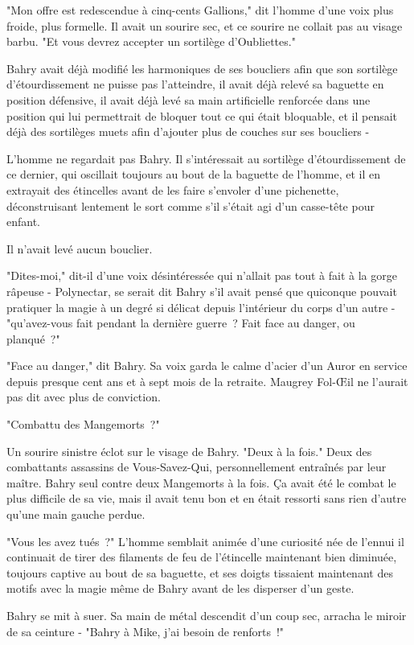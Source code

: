 "Mon offre est redescendue à cinq-cents Gallions," dit l'homme d'une voix plus froide, plus formelle. Il avait un sourire sec, et ce sourire ne collait pas au visage barbu. "Et vous devrez accepter un sortilège d'Oubliettes."

Bahry avait déjà modifié les harmoniques de ses boucliers afin que son sortilège d'étourdissement ne puisse pas l'atteindre, il avait déjà relevé sa baguette en position défensive, il avait déjà levé sa main artificielle renforcée dans une position qui lui permettrait de bloquer tout ce qui était bloquable, et il pensait déjà des sortilèges muets afin d'ajouter plus de couches sur ses boucliers -

L'homme ne regardait pas Bahry. Il s'intéressait au sortilège d'étourdissement de ce dernier, qui oscillait toujours au bout de la baguette de l'homme, et il en extrayait des étincelles avant de les faire s'envoler d'une pichenette, déconstruisant lentement le sort comme s'il s'était agi d'un casse-tête pour enfant.

Il n'avait levé aucun bouclier.

"Dites-moi," dit-il d'une voix désintéressée qui n'allait pas tout à fait à la gorge râpeuse - Polynectar, se serait dit Bahry s'il avait pensé que quiconque pouvait pratiquer la magie à un degré si délicat depuis l'intérieur du corps d'un autre - "qu'avez-vous fait pendant la dernière guerre~? Fait face au danger, ou planqué~?"

"Face au danger," dit Bahry. Sa voix garda le calme d'acier d'un Auror en service depuis presque cent ans et à sept mois de la retraite. Maugrey Fol-Œil ne l'aurait pas dit avec plus de conviction.

"Combattu des Mangemorts~?"

Un sourire sinistre éclot sur le visage de Bahry. "Deux à la fois." Deux des combattants assassins de Vous-Savez-Qui, personnellement entraînés par leur maître. Bahry seul contre deux Mangemorts à la fois. Ça avait été le combat le plus difficile de sa vie, mais il avait tenu bon et en était ressorti sans rien d'autre qu'une main gauche perdue.

"Vous les avez tués~?" L'homme semblait animée d'une curiosité née de l'ennui il continuait de tirer des filaments de feu de l'étincelle maintenant bien diminuée, toujours captive au bout de sa baguette, et ses doigts tissaient maintenant des motifs avec la magie même de Bahry avant de les disperser d'un geste.

Bahry se mit à suer. Sa main de métal descendit d'un coup sec, arracha le miroir de sa ceinture - "Bahry à Mike, j'ai besoin de renforts~!"

